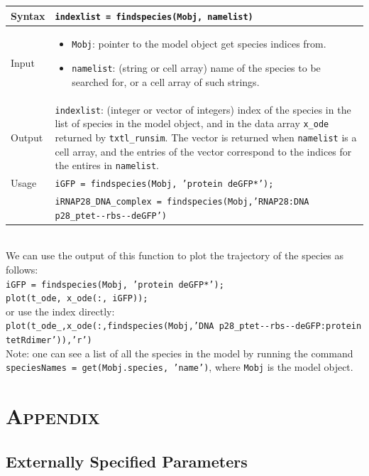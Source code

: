 \documentclass[english]{report}
\begin{document}
			\begin{tabular}{p{2cm}|p{13cm}}
			Syntax & \texttt{indexlist = findspecies(Mobj, namelist)}\\ \hline
			Input &  \begin{itemize}
				\item \texttt{Mobj}: pointer to the model object get species indices from.
				\item \texttt{namelist}: (string or cell array) name of the species to be searched for, or a cell array of such strings.
				\end{itemize} \\ \hline
			Output & \texttt{indexlist}: (integer or vector of integers) index of the species in the list of species in the model object, and in the data array \texttt{x\_ode} returned by \texttt{txtl\_runsim}. The vector is returned when \texttt{namelist} is a cell array, and the entries of the vector correspond to the indices for the entires in \texttt{namelist}. \\ \hline
			Usage & \texttt{iGFP = findspecies(Mobj, 'protein deGFP*');}\\
			& \texttt{iRNAP28\_DNA\_complex = findspecies(Mobj,'RNAP28:DNA p28\_ptet-{}-rbs-{}-deGFP')}
			\end{tabular} \\
			
			We can use the output of this function to plot the trajectory of the species as follows: \\
		\texttt{iGFP = findspecies(Mobj, 'protein deGFP*');}\\
  		\texttt{plot(t\_ode, x\_ode(:, iGFP));}	\\
  		  		
		or use the index directly: \\	
		\texttt{plot(t\_ode\_,x\_ode(:,findspecies(Mobj,'DNA p28\_ptet-{}-rbs-{}-deGFP:protein tetRdimer')),'r')} \\
		
		Note: one can see a list of all the species in the model by running the command \texttt{speciesNames = get(Mobj.species, 'name')}, where \texttt{Mobj} is the model object. 

\chapter{\textsc{Appendix}}

	\section{Externally Specified Parameters}
\end{document}
